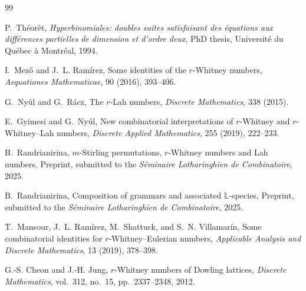\documentclass[12pt,a4paper]{article}
\theoremstyle{definition} %
\theoremstyle{remark}
\theoremstyle{examples}
\begin{document}
\begin{thebibliography}{99}
		
		
		P.~Th\'eor\^et,
		\newblock \emph{Hyperbinomiales: doubles suites satisfaisant des \'equations aux diff\'erences partielles de dimension et d'ordre deux},
		\newblock PhD thesis, Université du Québec à Montréal, 1994.
		
	
		
		I.~Mez\H{o} and J.~L. Ram\'irez,
		\newblock Some identities of the $r$-Whitney numbers,
		\newblock \emph{Aequationes Mathematicae}, 90 (2016), 393--406.
		
		G.~Ny\'ul and G.~R\'acz,
		\newblock The $r$-Lah numbers,
		\newblock \emph{Discrete Mathematics}, 338 (2015).
		
		E.~Gyimesi and G.~Ny\'ul,
		\newblock New combinatorial interpretations of $r$-Whitney and $r$-Whitney--Lah numbers,
		\newblock \emph{Discrete Applied Mathematics}, 255 (2019), 222--233.
		
		B.~Randrianirina,
		\newblock $m$-Stirling permutations, $r$-Whitney numbers and Lah numbers,
		\newblock Preprint, submitted to the \emph{S\'eminaire Lotharinghien de Combinatoire}, 2025.
		
		B.~Randrianirina,
		\newblock Composition of grammars and associated $\mathbb{L}$-species,
		\newblock Preprint, submitted to the \emph{S\'eminaire Lotharinghien de Combinatoire}, 2025.
		
		T.~Mansour, J.~L. Ram\'irez, M.~Shattuck, and S.~N. Villamar\'in,
		\newblock Some combinatorial identities for $r$-Whitney--Eulerian numbers,
		\newblock \emph{Applicable Analysis and Discrete Mathematics}, 13 (2019), 378--398.
		
		
		G.-S. Cheon and J.-H. Jung,
		\newblock $r$-Whitney numbers of Dowling lattices,
		\newblock \emph{Discrete Mathematics}, vol.~312, no.~15, pp.~2337--2348, 2012.
		
	\end{thebibliography}
	


	
\end{document}

